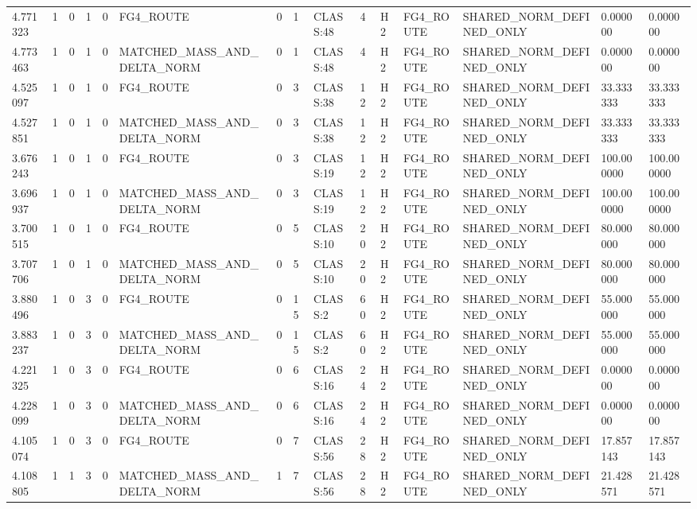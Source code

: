 \begin{tabular}{lllllllllllllll}
4.771323 & 1 & 0 & 1 & 0 & FG4\_ROUTE & 0 & 1 & CLASS:48 & 4 & H2 & FG4\_ROUTE & SHARED\_NORM\_DEFINED\_ONLY & 0.000000 & 0.000000 \\
4.773463 & 1 & 0 & 1 & 0 & MATCHED\_MASS\_AND\_DELTA\_NORM & 0 & 1 & CLASS:48 & 4 & H2 & FG4\_ROUTE & SHARED\_NORM\_DEFINED\_ONLY & 0.000000 & 0.000000 \\
4.525097 & 1 & 0 & 1 & 0 & FG4\_ROUTE & 0 & 3 & CLASS:38 & 12 & H2 & FG4\_ROUTE & SHARED\_NORM\_DEFINED\_ONLY & 33.333333 & 33.333333 \\
4.527851 & 1 & 0 & 1 & 0 & MATCHED\_MASS\_AND\_DELTA\_NORM & 0 & 3 & CLASS:38 & 12 & H2 & FG4\_ROUTE & SHARED\_NORM\_DEFINED\_ONLY & 33.333333 & 33.333333 \\
3.676243 & 1 & 0 & 1 & 0 & FG4\_ROUTE & 0 & 3 & CLASS:19 & 12 & H2 & FG4\_ROUTE & SHARED\_NORM\_DEFINED\_ONLY & 100.000000 & 100.000000 \\
3.696937 & 1 & 0 & 1 & 0 & MATCHED\_MASS\_AND\_DELTA\_NORM & 0 & 3 & CLASS:19 & 12 & H2 & FG4\_ROUTE & SHARED\_NORM\_DEFINED\_ONLY & 100.000000 & 100.000000 \\
3.700515 & 1 & 0 & 1 & 0 & FG4\_ROUTE & 0 & 5 & CLASS:10 & 20 & H2 & FG4\_ROUTE & SHARED\_NORM\_DEFINED\_ONLY & 80.000000 & 80.000000 \\
3.707706 & 1 & 0 & 1 & 0 & MATCHED\_MASS\_AND\_DELTA\_NORM & 0 & 5 & CLASS:10 & 20 & H2 & FG4\_ROUTE & SHARED\_NORM\_DEFINED\_ONLY & 80.000000 & 80.000000 \\
3.880496 & 1 & 0 & 3 & 0 & FG4\_ROUTE & 0 & 15 & CLASS:2 & 60 & H2 & FG4\_ROUTE & SHARED\_NORM\_DEFINED\_ONLY & 55.000000 & 55.000000 \\
3.883237 & 1 & 0 & 3 & 0 & MATCHED\_MASS\_AND\_DELTA\_NORM & 0 & 15 & CLASS:2 & 60 & H2 & FG4\_ROUTE & SHARED\_NORM\_DEFINED\_ONLY & 55.000000 & 55.000000 \\
4.221325 & 1 & 0 & 3 & 0 & FG4\_ROUTE & 0 & 6 & CLASS:16 & 24 & H2 & FG4\_ROUTE & SHARED\_NORM\_DEFINED\_ONLY & 0.000000 & 0.000000 \\
4.228099 & 1 & 0 & 3 & 0 & MATCHED\_MASS\_AND\_DELTA\_NORM & 0 & 6 & CLASS:16 & 24 & H2 & FG4\_ROUTE & SHARED\_NORM\_DEFINED\_ONLY & 0.000000 & 0.000000 \\
4.105074 & 1 & 0 & 3 & 0 & FG4\_ROUTE & 0 & 7 & CLASS:56 & 28 & H2 & FG4\_ROUTE & SHARED\_NORM\_DEFINED\_ONLY & 17.857143 & 17.857143 \\
4.108805 & 1 & 1 & 3 & 0 & MATCHED\_MASS\_AND\_DELTA\_NORM & 1 & 7 & CLASS:56 & 28 & H2 & FG4\_ROUTE & SHARED\_NORM\_DEFINED\_ONLY & 21.428571 & 21.428571 \\

\end{tabular}
